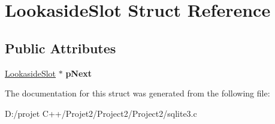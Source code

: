 \hypertarget{struct_lookaside_slot}{}\section{Lookaside\+Slot Struct Reference}
\label{struct_lookaside_slot}
\subsection*{Public Attributes}
\begin{DoxyCompactItemize}
\item 
\mbox{\label{struct_lookaside_slot_a3c3dd4a770ded51a68e8a651eba40f66}} 
\mbox{\hyperlink{struct_lookaside_slot}{Lookaside\+Slot}} $\ast$ {\bfseries p\+Next}
\end{DoxyCompactItemize}


The documentation for this struct was generated from the following file\+:\begin{DoxyCompactItemize}
\item 
D\+:/projet C++/\+Projet2/\+Project2/\+Project2/sqlite3.\+c\end{DoxyCompactItemize}
